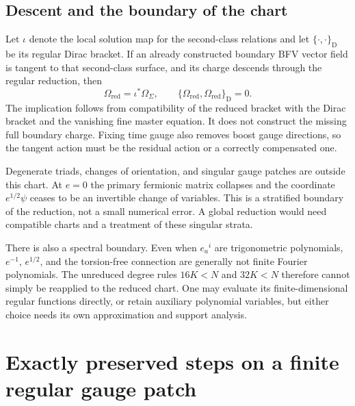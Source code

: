 \subsection{Descent and the boundary of the chart}
Let $\iota$ denote the local solution map for the second-class relations and let $\{\cdot,\cdot\}_{\mathrm D}$ be its regular Dirac bracket. If an already constructed boundary BFV vector field is tangent to that second-class surface, and its charge descends through the regular reduction, then
\begin{equation}
 \Omega_{\mathrm{red}}=\iota^*\Omega_\Sigma,
 \qquad
 \{\Omega_{\mathrm{red}},\Omega_{\mathrm{red}}\}_{\mathrm D}=0.
\end{equation}
The implication follows from compatibility of the reduced bracket with the Dirac bracket and the vanishing fine master equation. It does not construct the missing full boundary charge. Fixing time gauge also removes boost gauge directions, so the tangent action must be the residual action or a correctly compensated one.

Degenerate triads, changes of orientation, and singular gauge patches are outside this chart. At $e=0$ the primary fermionic matrix collapses and the coordinate $e^{1/2}\psi$ ceases to be an invertible change of variables. This is a stratified boundary of the reduction, not a small numerical error. A global reduction would need compatible charts and a treatment of these singular strata.

There is also a spectral boundary. Even when $e_a{}^i$ are trigonometric polynomials, $e^{-1}$, $e^{1/2}$, and the torsion-free connection are generally not finite Fourier polynomials. The unreduced degree rules $16K<N$ and $32K<N$ therefore cannot simply be reapplied to the reduced chart. One may evaluate its finite-dimensional regular functions directly, or retain auxiliary polynomial variables, but either choice needs its own approximation and support analysis.


\section{Exactly preserved steps on a finite regular gauge patch}
\label{c:constraints:step}

